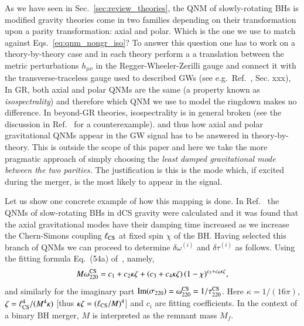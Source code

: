 \documentclass[twocolumn,prd,aps,superscriptaddress,preprintnumbers,tightenlines,showpacs,nofootinbib,eqsecnum,amsfonts,amsmath,longbibliography]{revtex4-1}
\newcommand{\Mf}{M_f}
\begin{document}
As we have seen in Sec.~\ref{sec:review_theories}, the QNM of slowly-rotating BHs
is modified gravity theories come in two families depending on their transformation upon a parity
transformation: axial and polar. Which is the one we use to match against Eqs.~\eqref{eq:qnm_nongr_iso}?
%
To answer this question one has to work on a theory-by-theory case and in each theory perform a
a translation between the metric perturbations $h_{\mu\nu}$ in the Regger-Wheeler-Zerilli gauge and
connect it with the transverse-traceless gauge used to described GWs (see e.g.~Ref.~\cite{Maggiore:2018sht}, Sec. xxx),
%
In GR, both axial and polar QNMs are the same (a property known as \emph{isospectrality}) and therefore which
QNM we use to model the ringdown makes no difference.
%
In beyond-GR theories, isospectrality is in general broken (see the discussion in Ref.~\cite{Hui:2021cpm} for a counterexample).
and thus how axial and polar gravitational QNMs appear in the GW signal has to be answered in theory-by-theory.
%
This is outside the scope of this paper and here we take the more pragmatic approach
of simply choosing the \emph{least damped gravitational mode between the two parities.}
%
The justification is this is the mode which, if excited during the merger, is
the most likely to appear in the signal.

Let us show one concrete example of how this mapping is done.
%
In Ref.~\cite{Wagle:2021tam} the QNMs of slow-rotating BHs in dCS gravity were calculated
and it was found that the axial gravitational modes have their damping time increased as we
increase the Chern-Simons coupling $\ell_{\rm CS}$ at fixed spin $\chi$ of the BH.
%
Having selected this branch of QNMs we can proceed to determine $\delta\omega^{(i)}$ and $\delta\tau^{(i)}$ as follows.
%
Using the fitting formula Eq.~(54a) of~\cite{Wagle:2021tam}, namely,
%
\begin{equation}
    M \omega^{\rm CS}_{220} = c_{1} + c_{2} \kappa \zeta + (c_{3} + c_{4} \kappa \zeta) \, (1 - \chi)^{c_{5} + c_{6} \kappa \zeta},
    \label{eq:omega_dsc_eg}
\end{equation}
%
and similarly for the imaginary part ${\rm Im}(\sigma_{220}) = \omega^{\rm CS}_{220} = 1 / \tau^{\rm CS}_{220}$.
%
Here $\kappa = 1/(16 \pi)$, $\zeta = \ell_{\rm CS}^{4} / (M^4 \kappa)$ [thus $\kappa \zeta = (\ell_{\rm CS} / M)^4$]
and $c_{i}$ are fitting coefficients.
%
In the context of a binary BH merger, $M$ is interpreted as the remnant mass $\Mf$.
\end{document}
